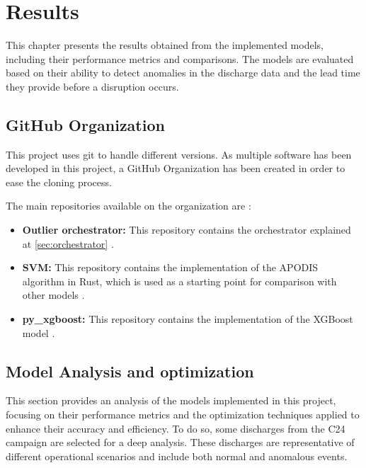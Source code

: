\chapter{Results}\label{sec:cap4}

This chapter presents the results obtained from the implemented models, including their performance metrics and comparisons. The models are evaluated based on their ability to detect anomalies in the discharge data and the lead time they provide before a disruption occurs.

\section{GitHub Organization}

This project uses git to handle different versions. As multiple software has been developed in this project, a GitHub Organization has been created in order to ease the cloning process.

The main repositories available on the organization are \autocite{OutlierClassifier}:

\begin{itemize}
    \item \textbf{Outlier orchestrator:} This repository contains the orchestrator explained at \autoref{sec:orchestrator} \autocite{OutlierClassifierOutlier_orchestrator2025a}.
    \item \textbf{SVM:} This repository contains the implementation of the \ac{APODIS} algorithm in Rust, which is used as a starting point for comparison with other models \autocite{OutlierClassifierSvm2025}.
    \item \textbf{py\_xgboost:} This repository contains the implementation of the XGBoost model \autocite{OutlierClassifierPy_xgboost2025}.
\end{itemize}

\section{Model Analysis and optimization}

This section provides an analysis of the models implemented in this project, focusing on their performance metrics and the optimization techniques applied to enhance their accuracy and efficiency. To do so, some discharges from the C24 campaign are selected for a deep analysis. These discharges are representative of different operational scenarios and include both normal and anomalous events.

